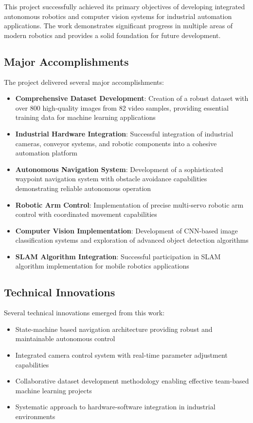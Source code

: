 \documentclass{book}
\begin{document}
\par\noindent This project successfully achieved its primary objectives of developing integrated autonomous robotics and computer vision systems for industrial automation applications. The work demonstrates significant progress in multiple areas of modern robotics and provides a solid foundation for future development.

\subsection{Major Accomplishments}

\par\noindent The project delivered several major accomplishments:

\begin{itemize}
\item \textbf{Comprehensive Dataset Development}: Creation of a robust dataset with over 800 high-quality images from 82 video samples, providing essential training data for machine learning applications
\item \textbf{Industrial Hardware Integration}: Successful integration of industrial cameras, conveyor systems, and robotic components into a cohesive automation platform
\item \textbf{Autonomous Navigation System}: Development of a sophisticated waypoint navigation system with obstacle avoidance capabilities demonstrating reliable autonomous operation
\item \textbf{Robotic Arm Control}: Implementation of precise multi-servo robotic arm control with coordinated movement capabilities
\item \textbf{Computer Vision Implementation}: Development of CNN-based image classification systems and exploration of advanced object detection algorithms
\item \textbf{SLAM Algorithm Integration}: Successful participation in SLAM algorithm implementation for mobile robotics applications
\end{itemize}

\subsection{Technical Innovations}

\par\noindent Several technical innovations emerged from this work:

\begin{itemize}
\item State-machine based navigation architecture providing robust and maintainable autonomous control
\item Integrated camera control system with real-time parameter adjustment capabilities
\item Collaborative dataset development methodology enabling effective team-based machine learning projects
\item Systematic approach to hardware-software integration in industrial environments
\end{itemize}
\end{document}

